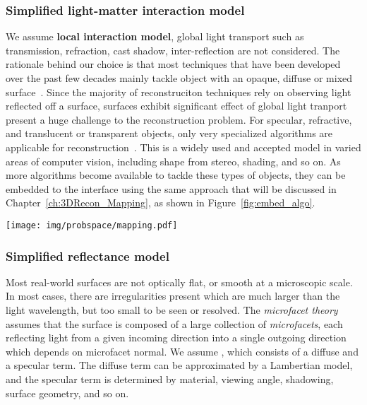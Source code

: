 \subsubsection{Simplified light-matter interaction model}
We assume \textbf{local interaction model}, \ie global light transport such as transmission, refraction, cast shadow, inter-reflection are not considered. The rationale behind our choice is that most techniques that have been developed over the past few decades mainly tackle object with an opaque, diffuse or mixed surface~\cite{ihrke2010transparent}. Since the majority of reconstruciton techniques rely on observing light reflected off a surface, surfaces exhibit significant effect of global light tranport present a huge challenge to the reconstruction problem. For specular, refractive, and translucent or transparent objects, only very specialized algorithms are applicable for reconstruction~\cite{ihrke2010transparent}. This is a widely used and accepted model in varied areas of computer vision, including shape from stereo, shading, and so on. As more algorithms become available to tackle these types of objects, they can be embedded to the interface using the same approach that will be discussed in Chapter~\ref{ch:3DRecon_Mapping}, as shown in Figure~\ref{fig:embed_algo}.
\begin{figure*}[!htbp]
\centering
\texttt{[image: img/probspace/mapping.pdf]}
\caption{Embed algorithms into the interface. The process is three-fold: 1) reduce problem space by discovering \textit{effective properties} denoted by red; 2) discover mapping from the lower-dimensional problem space to algorithm, denoted by green; 3) mapping from problem space to algorithms denoted by blue.}
\label{fig:embed_algo}
\end{figure*}

\subsubsection{Simplified reflectance model}
Most real-world surfaces are not optically flat, or smooth at a microscopic scale. In most cases, there are irregularities present which are much larger than the light wavelength, but too small to be seen or resolved. The \textit{microfacet theory} assumes that the surface is composed of a large collection of \textit{microfacets}, each reflecting light from a given incoming direction into a single outgoing direction which depends on microfacet normal. We assume , which consists of a diffuse and a specular term. The diffuse term can be approximated by a Lambertian model, and the specular term is determined by material, viewing angle, shadowing, surface geometry, and so on.

